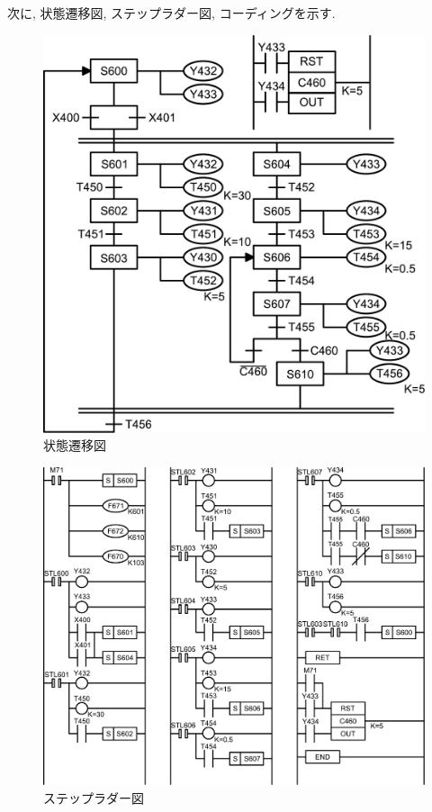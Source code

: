 \documentclass[titlepage]{jsarticle}
\begin{document}
    次に, 状態遷移図, ステップラダー図, コーディングを示す.
    \begin{figure}[h]
      \centering
      \includegraphics[width=14cm]{images/state.pdf}
      \caption{状態遷移図}
    \end{figure}
    \begin{figure}[h]
      \centering
      \includegraphics[width=14cm]{images/sig_lad.pdf}
      \caption{ステップラダー図}
    \end{figure}
\end{document}

